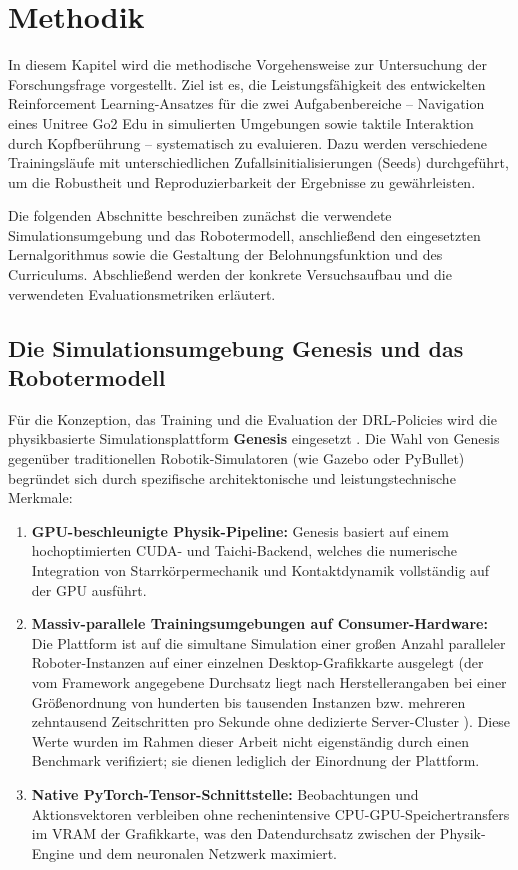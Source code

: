 \chapter{Methodik}\label{ch:methods}

In diesem Kapitel wird die methodische Vorgehensweise zur Untersuchung der Forschungsfrage vorgestellt. Ziel ist es, die Leistungsfähigkeit des entwickelten Reinforcement Learning-Ansatzes für die zwei Aufgabenbereiche – Navigation eines Unitree Go2 Edu in simulierten Umgebungen sowie taktile Interaktion durch Kopfberührung – systematisch zu evaluieren. Dazu werden verschiedene Trainingsläufe mit unterschiedlichen Zufallsinitialisierungen (Seeds) durchgeführt, um die Robustheit und Reproduzierbarkeit der Ergebnisse zu gewährleisten.

Die folgenden Abschnitte beschreiben zunächst die verwendete Simulationsumgebung und das Robotermodell, anschließend den eingesetzten Lernalgorithmus sowie die Gestaltung der Belohnungsfunktion und des Curriculums. Abschließend werden der konkrete Versuchsaufbau und die verwendeten Evaluationsmetriken erläutert.
\section{Die Simulationsumgebung Genesis und das Robotermodell}
Für die Konzeption, das Training und die Evaluation der DRL-Policies wird die physikbasierte Simulationsplattform \textbf{Genesis} eingesetzt \cite{authorsGenesisGenerativeUniversal2024}. Die Wahl von Genesis gegenüber traditionellen Robotik-Simulatoren (wie Gazebo oder PyBullet) begründet sich durch spezifische architektonische und leistungstechnische Merkmale:
\begin{enumerate}
	\item \textbf{GPU-beschleunigte Physik-Pipeline:} Genesis basiert auf einem hochoptimierten CUDA- und Taichi-Backend, welches die numerische Integration von Starrkörpermechanik und Kontaktdynamik vollständig auf der GPU ausführt.
	\item \textbf{Massiv-parallele Trainingsumgebungen auf Consumer-Hardware:} Die Plattform ist auf die simultane Simulation einer großen Anzahl paralleler Roboter-Instanzen auf einer einzelnen Desktop-Grafikkarte ausgelegt (der vom Framework angegebene Durchsatz liegt nach Herstellerangaben bei einer Größenordnung von hunderten bis tausenden Instanzen bzw. mehreren zehntausend Zeitschritten pro Sekunde ohne dedizierte Server-Cluster \cite{authorsGenesisGenerativeUniversal2024}). Diese Werte wurden im Rahmen dieser Arbeit nicht eigenständig durch einen Benchmark verifiziert; sie dienen lediglich der Einordnung der Plattform.
	\item \textbf{Native PyTorch-Tensor-Schnittstelle:} Beobachtungen und Aktionsvektoren verbleiben ohne rechenintensive CPU-GPU-Speichertransfers im VRAM der Grafikkarte, was den Datendurchsatz zwischen der Physik-Engine und dem neuronalen Netzwerk maximiert.
\end{enumerate}

